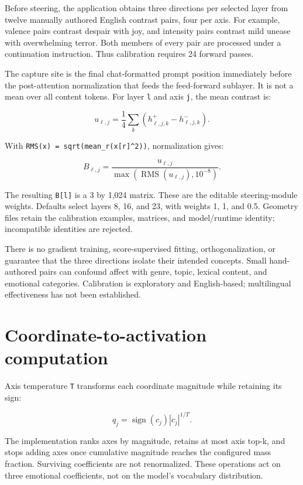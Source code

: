\documentclass[manuscript,screen,nonacm]{acmart}
\begin{document}
Before steering, the application obtains three directions per selected
layer from twelve manually authored English contrast pairs, four per
axis. For example, valence pairs contrast despair with joy, and
intensity pairs contrast mild unease with overwhelming terror. Both
members of every pair are processed under a continuation instruction.
Thus calibration requires 24 forward passes.

The capture site is the final chat-formatted prompt position immediately
before the post-attention normalization that feeds the feed-forward
sublayer. It is not a mean over all content tokens. For layer \nolinkurl{l}
and axis \nolinkurl{j}, the mean contrast is:

\[u_{\ell,j}=\frac14\sum_k(h^+_{\ell,j,k}-h^-_{\ell,j,k}).\]

With \texttt{RMS(x)\ =\ sqrt(mean\_r(x{[}r{]}\^{}2))}, normalization
gives:

\[B_{\ell,j}=\frac{u_{\ell,j}}{\max(\operatorname{RMS}(u_{\ell,j}),10^{-8})}.\]

The resulting \texttt{B{[}l{]}} is a 3 by 1,024 matrix. These are the
editable steering-module weights. Defaults select layers 8, 16, and 23,
with weights 1, 1, and 0.5. Geometry files retain the calibration
examples, matrices, and model/runtime identity; incompatible identities
are rejected.

There is no gradient training, score-supervised fitting,
orthogonalization, or guarantee that the three directions isolate their
intended concepts. Small hand-authored pairs can confound affect with
genre, topic, lexical content, and emotional categories. Calibration is
exploratory and English-based; multilingual effectiveness has not been
established.



\section{Coordinate-to-activation
computation}\label{coordinate-to-activation-computation}

Axis temperature \nolinkurl{T} transforms each coordinate magnitude while
retaining its sign:

\[q_j=\operatorname{sign}(c_j)|c_j|^{1/T}.\]

The implementation ranks axes by magnitude, retains at most axis top-k,
and stops adding axes once cumulative magnitude reaches the configured
mass fraction. Surviving coefficients are not renormalized. These
operations act on three emotional coefficients, not on the model's
vocabulary distribution.
\end{document}
